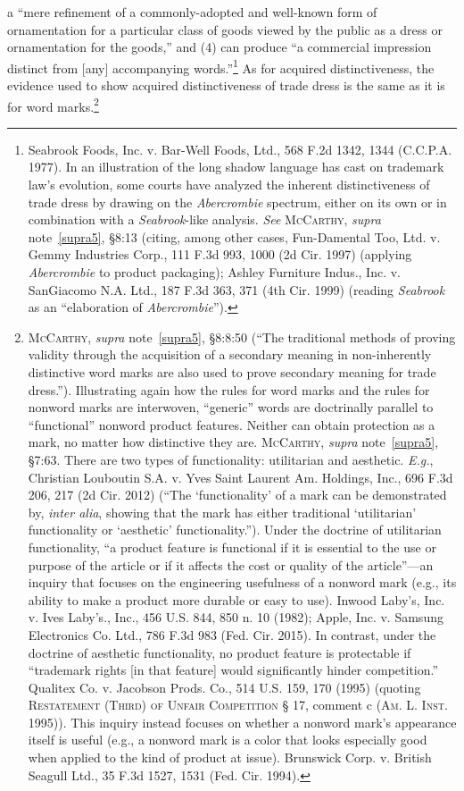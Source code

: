 \documentclass[letterpaper, 11pt, oneside]{article}
\begin{document}
a ``mere refinement of a commonly-adopted and well-known form of ornamentation for a particular class of goods viewed by the public as a dress or ornamentation for the goods,'' and (4) can produce ``a commercial impression distinct from [any] accompanying words.''\footnote{Seabrook Foods, Inc. v. Bar-Well Foods, Ltd., 568 F.2d 1342, 1344 (C.C.P.A. 1977). In an illustration of the long shadow language has cast on trademark law's evolution, some courts have analyzed the inherent distinctiveness of trade dress by drawing on the \textit{Abercrombie} spectrum, either on its own or in combination with a \textit{Seabrook}-like analysis. \textit{See} \textsc{McCarthy}, \textit{supra} note~\ref{supra5}, \S 8:13 (citing, among other cases, Fun-Damental Too, Ltd. v. Gemmy Industries Corp., 111 F.3d 993, 1000 (2d Cir. 1997) (applying \textit{Abercrombie} to product packaging); Ashley Furniture Indus., Inc. v. SanGiacomo N.A. Ltd., 187 F.3d 363, 371 (4th Cir. 1999) (reading \textit{Seabrook} as an ``elaboration of \textit{Abercrombie}'').} As for acquired distinctiveness, the evidence used to show acquired distinctiveness of trade dress is the same as it is for word marks.\footnote{\textsc{McCarthy}, \textit{supra} note~\ref{supra5}, \S 8:8:50 (``The traditional methods of proving validity through the acquisition of a secondary meaning in non-inherently distinctive word marks are also used to prove secondary meaning for trade dress.''). Illustrating again how the rules for word marks and the rules for nonword marks are interwoven, ``generic'' words are doctrinally parallel to ``functional'' nonword product features. Neither can obtain protection as a mark, no matter how distinctive they are. \textsc{McCarthy}, \textit{supra} note~\ref{supra5}, \S 7:63. There are two types of functionality: utilitarian and aesthetic. \textit{E.g.}, Christian Louboutin S.A. v. Yves Saint Laurent Am. Holdings, Inc., 696 F.3d 206, 217 (2d Cir. 2012) (``The `functionality' of a mark can be demonstrated by, \textit{inter alia}, showing that the mark has either traditional `utilitarian' functionality or `aesthetic' functionality.''). Under the doctrine of utilitarian functionality, ``a product feature is functional if it is essential to the use or purpose of the article or if it affects the cost or quality of the article''—an inquiry that focuses on the engineering usefulness of a nonword mark (e.g., its ability to make a product more durable or easy to use). Inwood Laby's, Inc. v. Ives Laby's., Inc., 456 U.S. 844, 850 n. 10 (1982); Apple, Inc. v. Samsung Electronics Co. Ltd., 786 F.3d 983 (Fed. Cir. 2015). In contrast, under the doctrine of aesthetic functionality, no product feature is protectable if ``trademark rights [in that feature] would significantly hinder competition.'' Qualitex Co. v. Jacobson Prods. Co., 514 U.S. 159, 170 (1995) (quoting \textsc{Restatement (Third) of Unfair Competition} § 17, comment c (\textsc{Am. L. Inst.} 1995)). This inquiry instead focuses on whether a nonword mark's appearance itself is useful (e.g., a nonword mark is a color that looks especially good when applied to the kind of product at issue). Brunswick Corp. v. British Seagull Ltd., 35 F.3d 1527, 1531 (Fed. Cir. 1994).}
\end{document}
